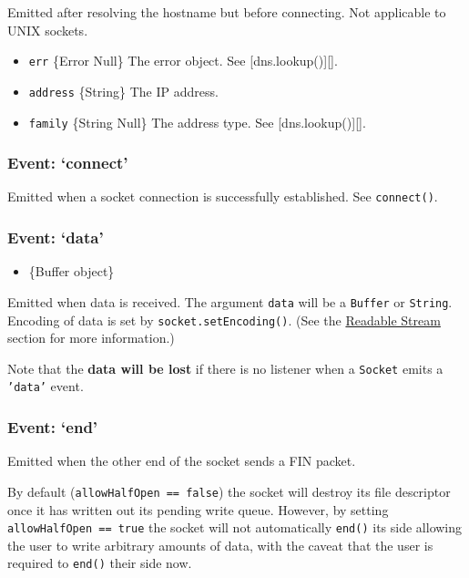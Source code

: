 Emitted after resolving the hostname but before connecting. Not
applicable to UNIX sockets.

\begin{itemize}
\item
  \texttt{err} \{Error \textbar{} Null\} The error object. See
  {[}dns.lookup(){]}{[}{]}.
\item
  \texttt{address} \{String\} The IP address.
\item
  \texttt{family} \{String \textbar{} Null\} The address type. See
  {[}dns.lookup(){]}{[}{]}.
\end{itemize}

\subsubsection{Event: `connect'}

Emitted when a socket connection is successfully established. See
\texttt{connect()}.

\subsubsection{Event: `data'}

\begin{itemize}
\item
  \{Buffer object\}
\end{itemize}

Emitted when data is received. The argument \texttt{data} will be a
\texttt{Buffer} or \texttt{String}. Encoding of data is set by
\texttt{socket.setEncoding()}. (See the
\href{stream.html\#stream\_readable\_stream}{Readable Stream} section
for more information.)

Note that the \textbf{data will be lost} if there is no listener when a
\texttt{Socket} emits a \texttt{'data'} event.

\subsubsection{Event: `end'}

Emitted when the other end of the socket sends a FIN packet.

By default (\texttt{allowHalfOpen == false}) the socket will destroy its
file descriptor once it has written out its pending write queue.
However, by setting \texttt{allowHalfOpen == true} the socket will not
automatically \texttt{end()} its side allowing the user to write
arbitrary amounts of data, with the caveat that the user is required to
\texttt{end()} their side now.

